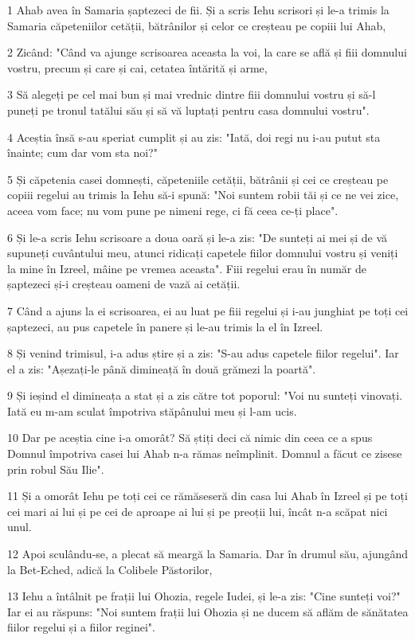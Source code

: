 \par 1 Ahab avea în Samaria șaptezeci de fii. Și a scris Iehu scrisori și le-a trimis la Samaria căpeteniilor cetății, bătrânilor și celor ce creșteau pe copiii lui Ahab,
\par 2 Zicând: "Când va ajunge scrisoarea aceasta la voi, la care se află și fiii domnului vostru, precum și care și cai, cetatea întărită și arme,
\par 3 Să alegeți pe cel mai bun și mai vrednic dintre fiii domnului vostru și să-l puneți pe tronul tatălui său și să vă luptați pentru casa domnului vostru".
\par 4 Aceștia însă s-au speriat cumplit și au zis: "Iată, doi regi nu i-au putut sta înainte; cum dar vom sta noi?"
\par 5 Și căpetenia casei domnești, căpeteniile cetății, bătrânii și cei ce creșteau pe copiii regelui au trimis la Iehu să-i spună: "Noi suntem robii tăi și ce ne vei zice, aceea vom face; nu vom pune pe nimeni rege, ci fă ceea ce-ți place".
\par 6 Și le-a scris Iehu scrisoare a doua oară și le-a zis: "De sunteți ai mei și de vă supuneți cuvântului meu, atunci ridicați capetele fiilor domnului vostru și veniți la mine în Izreel, mâine pe vremea aceasta". Fiii regelui erau în număr de șaptezeci și-i creșteau oameni de vază ai cetății.
\par 7 Când a ajuns la ei scrisoarea, ei au luat pe fiii regelui și i-au junghiat pe toți cei șaptezeci, au pus capetele în panere și le-au trimis la el în Izreel.
\par 8 Și venind trimisul, i-a adus știre și a zis: "S-au adus capetele fiilor regelui". Iar el a zis: "Așezați-le până dimineață în două grămezi la poartă".
\par 9 Și ieșind el dimineața a stat și a zis către tot poporul: "Voi nu sunteți vinovați. Iată eu m-am sculat împotriva stăpânului meu și l-am ucis.
\par 10 Dar pe aceștia cine i-a omorât? Să știți deci că nimic din ceea ce a spus Domnul împotriva casei lui Ahab n-a rămas neîmplinit. Domnul a făcut ce zisese prin robul Său Ilie".
\par 11 Și a omorât Iehu pe toți cei ce rămăseseră din casa lui Ahab în Izreel și pe toți cei mari ai lui și pe cei de aproape ai lui și pe preoții lui, încât n-a scăpat nici unul.
\par 12 Apoi sculându-se, a plecat să meargă la Samaria. Dar în drumul său, ajungând la Bet-Eched, adică la Colibele Păstorilor,
\par 13 Iehu a întâlnit pe frații lui Ohozia, regele Iudei, și le-a zis: "Cine sunteți voi?" Iar ei au răspuns: "Noi suntem frații lui Ohozia și ne ducem să aflăm de sănătatea fiilor regelui și a fiilor reginei".
